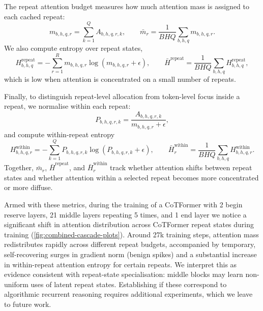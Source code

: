 \documentclass[10pt]{article}
\begin{document}
The repeat attention budget measures how much attention mass is assigned to
each cached repeat:
\[
    m_{b,h,q,r} = \sum_{k=1}^{Q} A_{b,h,q,r,k},
    \qquad
    \bar{m}_{r}
    =
    \frac{1}{BHQ}
    \sum_{b,h,q} m_{b,h,q,r}.
\]
We also compute entropy over repeat states,
\[
    H^{\mathrm{repeat}}_{b,h,q}
    =
    -\sum_{r=1}^{R}
    m_{b,h,q,r}
    \log(m_{b,h,q,r}+\epsilon),
    \qquad
    \bar{H}^{\mathrm{repeat}}
    =
    \frac{1}{BHQ}
    \sum_{b,h,q}
    H^{\mathrm{repeat}}_{b,h,q},
\]
which is low when attention is concentrated on a small number of repeats.

Finally, to distinguish repeat-level allocation from token-level focus inside a
repeat, we normalise within each repeat:
\[
    P_{b,h,q,r,k}
    =
    \frac{A_{b,h,q,r,k}}{m_{b,h,q,r}+\epsilon},
\]
and compute within-repeat entropy
\[
    H^{\mathrm{within}}_{b,h,q,r}
    =
    -\sum_{k=1}^{Q}
    P_{b,h,q,r,k}
    \log(P_{b,h,q,r,k}+\epsilon),
    \qquad
    \bar{H}^{\mathrm{within}}_{r}
    =
    \frac{1}{BHQ}
    \sum_{b,h,q}
    H^{\mathrm{within}}_{b,h,q,r}.
\]
Together, \(\bar{m}_{r}\), \(\bar{H}^{\mathrm{repeat}}\), and
\(\bar{H}^{\mathrm{within}}_{r}\) track whether attention shifts between repeat
states and whether attention within a selected repeat becomes more concentrated
or more diffuse.



Armed with these metrics, during the training of a CoTFormer with 2 begin reserve layers, 21 middle layers repeating 5 times, and 1 end layer we notice a significant shift in attention distribution across CoTFormer repeat states during training (\cref{fig:combined-cascade-plots}). Around 27k training steps, attention mass redistributes rapidly across different repeat budgets, accompanied by temporary, self-recovering surges in gradient norm (benign spikes) and a substantial increase in within-repeat attention entropy for certain repeats. We interpret this as evidence consistent with repeat-state specialisation: middle blocks may learn non-uniform uses of latent repeat states. Establishing if these correspond to algorithmic recurrent reasoning requires additional experiments, which we leave to future work.
\end{document}
